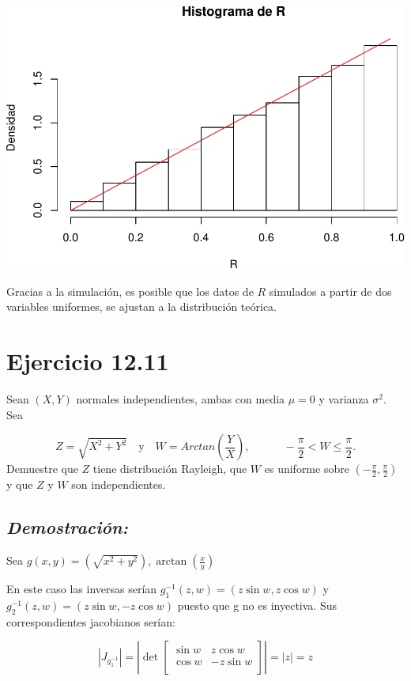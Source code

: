 \documentclass[]{article}
\begin{document}
\includegraphics{notebook_simulaciones_files/figure-latex/unnamed-chunk-1-1.pdf}

Gracias a la simulación, es posible que los datos de \(R\) simulados a
partir de dos variables uniformes, se ajustan a la distribución teórica.

\section{Ejercicio 12.11}\label{ejercicio-12.11}

Sean \((X, Y)\) normales independientes, ambas con media \(\mu=0\) y
varianza \(\sigma^2\). Sea

\[
Z = \sqrt{X^2 + Y^2} \quad \text{y}\quad W=Arctan\left(\frac{Y}{X}\right), \quad\quad\quad-\frac{\pi}{2}<W\leq\frac{\pi}{2}.
\] Demuestre que \(Z\) tiene distribución Rayleigh, que \(W\) es
uniforme sobre \(\left(-\frac{\pi}{2},\frac{\pi}{2} \right)\) y que
\(Z\) y \(W\) son independientes.

\subsection{\texorpdfstring{\emph{Demostración:}}{Demostración:}}\label{demostracion-1}

Sea
\(g(x,y)=\left(\sqrt{x^2+y^2}\right), \arctan\left(\frac{x}{y}\right)\)

En este caso las inversas serían \(g_1^{-1}(z,w)=(z\sin w,z\cos w)\) y
\(g_2^{-1}(z,w)=(z\sin w,-z\cos w)\) puesto que g no es inyectiva. Sus
correspondientes jacobianos serían:

\begin{equation}
\left| J_{g_1^{-1}}  \right|
=\left| \det 
\begin{bmatrix} 
\sin w &  z\cos w \\
\cos w &  -z\sin w \\
\end{bmatrix}  \right|
=|z|=z
\end{equation}
\end{document}
